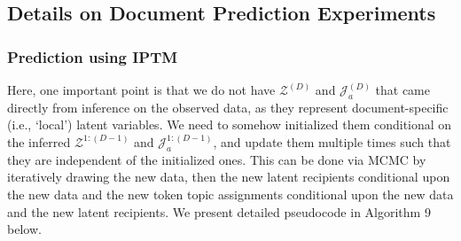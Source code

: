 \documentclass[a4paper]{article}
\begin{document}
      \subsection{Details on Document Prediction Experiments}\label{subsec:Details on PPE}    
       \subsubsection{Prediction using IPTM} \label{subsubsec: IPTM PPE}
        Here, one important point is that we do not have $\mathcal{Z}^{(D)}$ and $\mathcal{J}_a^{(D)}$ that came directly from inference on the observed data, as they represent document-specific (i.e., `local') latent variables. We need to somehow initialized them conditional on the inferred $\mathcal{Z}^{1:(D-1)}$ and $\mathcal{J}_a^{1:(D-1)}$, and update them multiple times such that they are independent of the initialized ones. This can be done via MCMC by iteratively drawing the new data, then the new latent recipients conditional upon the new data and the new token topic assignments conditional upon the new data and the new latent recipients. We present detailed pseudocode in Algorithm 9 below.
\end{document}

